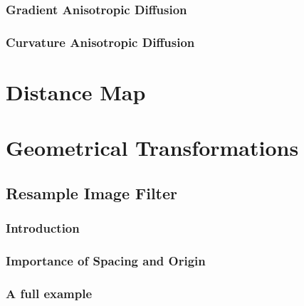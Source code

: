 \subsubsection{Gradient Anisotropic Diffusion}
\label{sec:ColorGradientAnisotropicDiffusion}

%

\subsubsection{Curvature Anisotropic Diffusion}
\label{sec:ColorCurvatureAnisotropicDiffusion}

%



\section{Distance Map}
\label{sec:DistanceMap}

%



\section{Geometrical Transformations}
\label{sec:GeometricalTransformationFilters}

\subsection{Resample Image Filter}
\label{sec:ResampleImageFilter}

\subsubsection{Introduction}
%

\subsubsection{Importance of Spacing and Origin}
%

\subsubsection{A full example}
%



